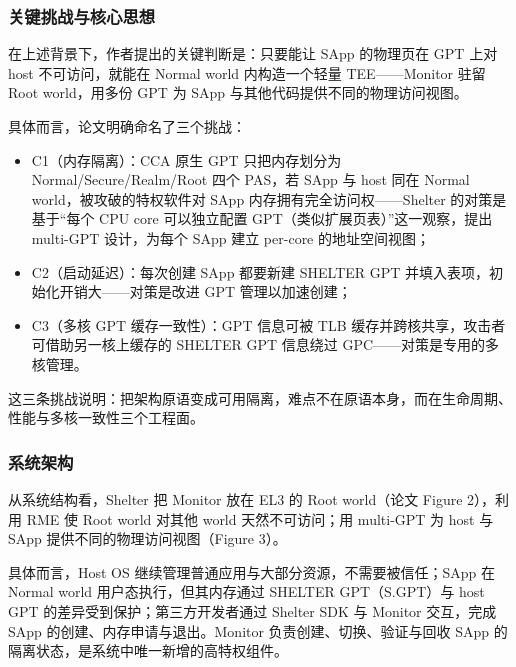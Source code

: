 \documentclass[11pt]{ctexart}
\begin{document}
\subsubsection{关键挑战与核心思想}
在上述背景下，作者提出的关键判断是：只要能让 SApp 的物理页在 GPT 上对 host 不可访问，就能在 Normal world 内构造一个轻量 TEE——Monitor 驻留 Root world，用多份 GPT 为 SApp 与其他代码提供不同的物理访问视图。\par
具体而言，论文明确命名了三个挑战：
\begin{itemize}
\item C1（内存隔离）：CCA 原生 GPT 只把内存划分为 Normal/Secure/Realm/Root 四个 PAS，若 SApp 与 host 同在 Normal world，被攻破的特权软件对 SApp 内存拥有完全访问权——Shelter 的对策是基于“每个 CPU core 可以独立配置 GPT（类似扩展页表）”这一观察，提出 multi-GPT 设计，为每个 SApp 建立 per-core 的地址空间视图；
\item C2（启动延迟）：每次创建 SApp 都要新建 SHELTER GPT 并填入表项，初始化开销大——对策是改进 GPT 管理以加速创建；
\item C3（多核 GPT 缓存一致性）：GPT 信息可被 TLB 缓存并跨核共享，攻击者可借助另一核上缓存的 SHELTER GPT 信息绕过 GPC——对策是专用的多核管理。
\end{itemize}
这三条挑战说明：把架构原语变成可用隔离，难点不在原语本身，而在生命周期、性能与多核一致性三个工程面。\par
\subsubsection{系统架构}
从系统结构看，Shelter 把 Monitor 放在 EL3 的 Root world（论文 Figure 2），利用 RME 使 Root world 对其他 world 天然不可访问；用 multi-GPT 为 host 与 SApp 提供不同的物理访问视图（Figure 3）。\par
具体而言，Host OS 继续管理普通应用与大部分资源，不需要被信任；SApp 在 Normal world 用户态执行，但其内存通过 SHELTER GPT（S.GPT）与 host GPT 的差异受到保护；第三方开发者通过 Shelter SDK 与 Monitor 交互，完成 SApp 的创建、内存申请与退出。Monitor 负责创建、切换、验证与回收 SApp 的隔离状态，是系统中唯一新增的高特权组件。\par
\end{document}
